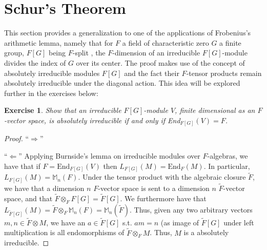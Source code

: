 \documentclass{article}
\newtheorem{exercise}{Exercise}[section]
\begin{document}
\pagebreak

\section{Schur's Theorem}

This section provides a generalization to one of the applications of Frobenius's arithmetic lemma, namely that for $F$ a field of characteristic zero $G$ a finite group, $F[G]$ being $F$-split , the $F$-dimension of an irreducible $F[G]$-module divides the index of $G$ over its center. The proof makes use of the concept of absolutely irreducible modules $F[G]$ and the fact their $F$-tensor products remain absolutely irreducible under the diagonal action. This idea will be explored further in the exercises below:

\begin{exercise}
Show that an irreducible $F[G]$-module $V$, finite dimensional as an $F$-vector
space, is absolutely irreducible if and only if End$_{F[G]}(V) = F$.
\end{exercise}

\begin{proof}

``$\Rightarrow$'' 
  
``$\Leftarrow$'' Applying Burnside's lemma on irreducible modules over $F$-algebras, we have that if $F = \text{End}_{F[G]}(V)$ then $L_{F[G]}(M) = \text{End}_{F}(M)$. In particular, $L_{F[G]}(M) = \mathbb{M}_{n}(F)$. Under the tensor product with the algebraic closure $\widetilde F$, we have that a dimension $n$ $F$-vector space is sent to a dimension $n$ $\widetilde F$-vector space, and that $\widetilde F \otimes_{F} F[G] = \widetilde F [G]$. We furthermore have that $L_{\widetilde F[G]}(M) = \widetilde F \otimes_{F} \mathbb{M}_{n}(F) =  \mathbb{M}_{n}(\widetilde F)$. Thus, given any two arbitrary vectors $m, n \in \widetilde F \otimes M$, we have an $a \in \widetilde F[G]$ s.t. $am = n$ (as image of $\widetilde F[G]$ under left multiplication is all endomorphisms of $\widetilde F \otimes_{F}M$. Thus, $M$ is a absolutely irreducible.  
  \end{proof}
\pagebreak



\end{document}

